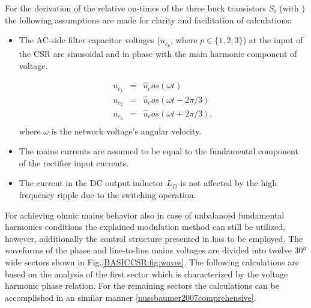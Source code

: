 For the derivation of the relative on-times of the three buck transistors $S_i$ (with ) the following assumptions are made for clarity and facilitation of calculations:
\begin{itemize}
	\item The AC-side filter capacitor voltages ($u_{c_p}$, where $p\in\{1,2,3\}$) at the input of the CSR are sinusoidal and in phase with the main harmonic component of voltage.
	
	\begin{equation}
        \begin{array}{rcl}
            u_{c_1}&=&\widehat{u}_cos(\omega t)\\
						u_{c_2}&=&\widehat{u}_cos(\omega t-2\pi/3)\\
						u_{c_3}&=&\widehat{u}_cos(\omega t+2\pi/3),\\
        \end{array}
        \label{BASICMPC:equ:basic_LTI}
    \end{equation}
	where $\omega$ is the network voltage's angular velocity.
	
	\item The mains currents are assumed to be equal to the fundamental component of the rectifier input currents.
	\item The current in the DC output inductor $L_{D}$ is not affected by the high frequency ripple due to the switching operation.
\end{itemize}

 For achieving ohmic mains behavior also in case of unbalanced fundamental harmonics conditions the explained modulation method can still be utilized, however, additionally the control structure presented in \cite{baumann2005novel} has to be employed. The
waveforms of the phase and line-to-line mains voltages are divided into twelve $30°$wide sectors shown in Fig.\ref{BASICCSR:fig:waves}. The following calculations are based on the analysis of the first sector which is characterized by the voltage harmonic phase relation. For the remaining sectors the calculations can be accomplished in an similar manner \ref{nussbaumer2007comprehensive}.

